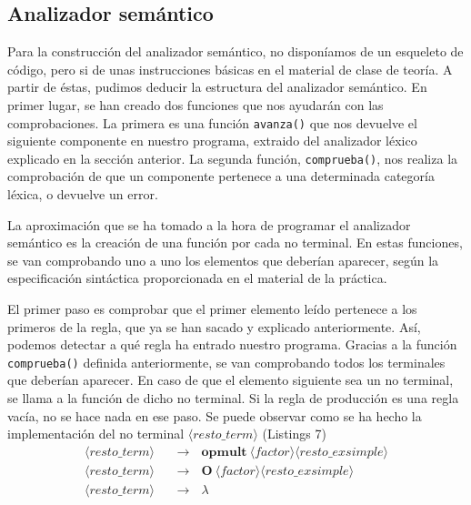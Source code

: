 \documentclass[11pt]{article}
\newcommand{\nt}[1]{\langle#1\rangle}
\newcommand{\regla}[2]{\nt{#1} \ \ \ &\rightarrow \ \ \ #2 \\}
\begin{document}
\subsection{Analizador semántico}
Para la construcción del analizador semántico, no disponíamos de un esqueleto de código, pero si de unas instrucciones básicas en el material de clase de teoría. A partir de éstas, pudimos deducir la estructura del analizador semántico. En primer lugar, se han creado dos funciones que nos ayudarán con las comprobaciones. La primera es una función \lstinline[language=Python]{avanza()} que nos devuelve el siguiente componente en nuestro programa, extraido del analizador léxico explicado en la sección anterior. La segunda función, \lstinline[language=Python]{comprueba()}, nos realiza la comprobación de que un componente pertenece a una determinada categoría léxica, o devuelve un error. 

La aproximación que se ha tomado a la hora de programar el analizador semántico es la creación de una función por cada no terminal. En estas funciones, se van comprobando uno a uno los elementos que deberían aparecer, según la especificación sintáctica proporcionada en el material de la práctica. 

El primer paso es comprobar que el primer elemento leído pertenece a los primeros de la regla, que ya se han sacado y explicado anteriormente. Así, podemos detectar a qué regla ha entrado nuestro programa. Gracias a la función \lstinline[language=Python]{comprueba()} definida anteriormente, se van comprobando todos los terminales que deberían aparecer. En caso de que el elemento siguiente sea un no terminal, se llama a la función de dicho no terminal. Si la regla de producción es una regla vacía, no se hace nada en ese paso. Se puede observar como se ha hecho la implementación del no terminal $\nt{resto\_term}$ (Listings 7)
\begin{align*}
	\regla{resto\_term}{\textbf{opmult} \ \nt{factor} \nt{resto\_exsimple}}
	\regla{resto\_term}{\textbf{O} \ \nt{factor} \nt{resto\_exsimple}}
	\regla{resto\_term}{\lambda}
\end{align*}
\end{document}
